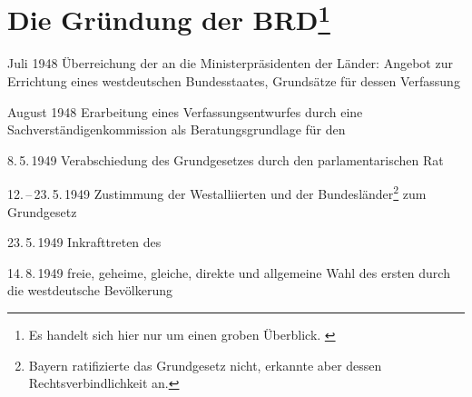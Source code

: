 \section[Gründung der BRD]{Die Gründung der BRD\footnote{Es
handelt sich hier nur um einen groben Überblick. \label{ftn:grob-ueb}}
}
\label{sec:gruend-brd}

\begin{chronik}
\item[Juli 1948]
Überreichung der  an die
Ministerpräsidenten der Länder: Angebot zur Errichtung eines
westdeutschen Bundesstaates, Grundsätze für dessen Verfassung

\item[August 1948]
Erarbeitung eines Verfassungsentwurfes durch eine
Sachverständigenkommission als Beratungsgrundlage für den
\textsc{}

\item[8.\,5.\,1949]
Verabschiedung des Grundgesetzes durch den parlamentarischen Rat

\item[12.\,--\,23.\,5.\,1949]
Zustimmung der Westalliierten und der Bundesländer\footnote{Bayern
ratifizierte das Grundgesetz nicht, erkannte aber dessen
Rechtsverbindlichkeit an.} zum Grundgesetz 

\item[23.\,5.\,1949]
Inkrafttreten des 

\item[14.\,8.\,1949]
freie, geheime, gleiche, direkte und allgemeine Wahl des ersten
 durch die
westdeutsche Bevölkerung
\end{chronik}
